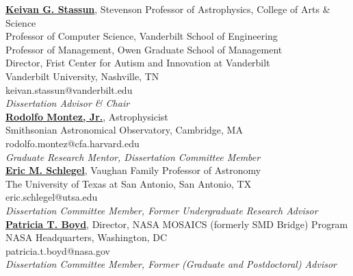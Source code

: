 \documentclass[12pt]{article}
\begin{document}
\noindent
\href{http://astro.phy.vanderbilt.edu/~stassuk/}{\textbf{Keivan G. Stassun}}, Stevenson Professor of Astrophysics,  College of Arts \& Science \\
Professor of Computer Science, Vanderbilt School of Engineering \\
Professor of Management,     Owen Graduate School of Management \\
Director,  Frist Center for Autism and Innovation at Vanderbilt \\
Vanderbilt University, Nashville, TN \\
keivan.stassun@vanderbilt.edu \\
\textit{Dissertation Advisor \& Chair} \\

\noindent
\href{http://www.rudyphd.com/}{\textbf{Rodolfo Montez, Jr.}}, Astrophysicist \\
Smithsonian Astronomical Observatory, Cambridge, MA \\
rodolfo.montez@cfa.harvard.edu \\
\textit{Graduate Research Mentor, Dissertation Committee Member} \\

\noindent
\href{https://sciences.utsa.edu/faculty/profiles/schlegel-eric.html}{\textbf{Eric M. Schlegel}}, Vaughan Family Professor of Astronomy \\
The University of Texas at San Antonio, San Antonio, TX \\
eric.schlegel@utsa.edu \\
\textit{Dissertation Committee Member, Former Undergraduate Research Advisor} \\

\noindent
\href{https://science.gsfc.nasa.gov/sed/bio/patricia.t.boyd}{\textbf{Patricia T. Boyd}}, Director, NASA MOSAICS (formerly SMD Bridge) Program \\
NASA Headquarters, Washington, DC \\
patricia.t.boyd@nasa.gov \\
\textit{Dissertation Committee Member, Former (Graduate and Postdoctoral) Advisor} \\
\end{document}
